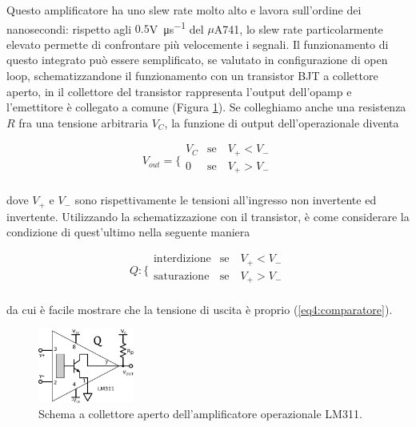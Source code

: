 Questo amplificatore ha uno slew rate molto alto e lavora sull'ordine dei nanosecondi: rispetto agli $0.5$\si{\volt\per\micro\second} del $\mu$A741, lo slew rate particolarmente elevato permette di confrontare più velocemente i segnali.
Il funzionamento di questo integrato può essere semplificato, se valutato in configurazione di open loop, schematizzandone il funzionamento con un transistor BJT a collettore aperto, in il collettore del transistor rappresenta l'output dell'opamp e l'emettitore è collegato a comune (Figura \ref{cir4:open_collector}).
Se colleghiamo anche una resistenza $R$ fra una tensione arbitraria $V_C$, la funzione di output dell'operazionale diventa

\begin{equation}
V_{out} = \bigg \{
\begin{array}{rl}
V_C & \mathrm{se} \quad V_+ < V_- \\
0 & \mathrm{se} \quad V_+ > V_- \\
\end{array}
\label{eq4:comparatore}
\end{equation}

dove $V_+$ e $V_-$ sono rispettivamente le tensioni all'ingresso non invertente ed invertente. Utilizzando la schematizzazione con il transistor, è come considerare la condizione di quest'ultimo nella seguente maniera

\begin{equation}
Q : \bigg \{
\begin{array}{rl}
\mathrm{interdizione} & \mathrm{se} \quad V_+ < V_- \\
\mathrm{saturazione} & \mathrm{se} \quad V_+ > V_- \\
\end{array}
\label{eq4:comparatore_Q}
\end{equation}

da cui è facile mostrare che la tensione di uscita è proprio (\ref{eq4:comparatore}).

\begin{figure}
  \begin{center}
    \includegraphics[width=0.280\textwidth]{../E04/latex/c_LM311.pdf}
  \end{center}
  \caption{Schema a collettore aperto dell'amplificatore operazionale LM311.}
  \label{cir4:open_collector}
\end{figure}

